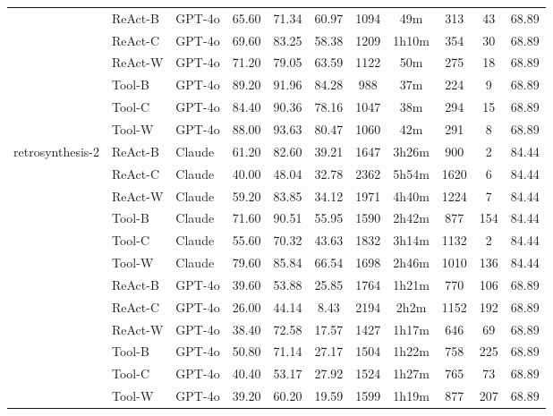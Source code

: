 \begin{longtable}{lllcccccccc}
 & ReAct-B & GPT-4o & 65.60 & 71.34 & 60.97 & 1094 & 49m & 313 & 43 & 68.89 \\
 & ReAct-C & GPT-4o & 69.60 & 83.25 & 58.38 & 1209 & 1h10m & 354 & 30 & 68.89 \\
 & ReAct-W & GPT-4o & 71.20 & 79.05 & 63.59 & 1122 & 50m & 275 & 18 & 68.89 \\
 & Tool-B & GPT-4o & 89.20 & 91.96 & 84.28 & 988 & 37m & 224 & 9 & 68.89 \\
 & Tool-C & GPT-4o & 84.40 & 90.36 & 78.16 & 1047 & 38m & 294 & 15 & 68.89 \\
 & Tool-W & GPT-4o & 88.00 & 93.63 & 80.47 & 1060 & 42m & 291 & 8 & 68.89 \\
retrosynthesis-2 & ReAct-B & Claude & 61.20 & 82.60 & 39.21 & 1647 & 3h26m & 900 & 2 & 84.44 \\
 & ReAct-C & Claude & 40.00 & 48.04 & 32.78 & 2362 & 5h54m & 1620 & 6 & 84.44 \\
 & ReAct-W & Claude & 59.20 & 83.85 & 34.12 & 1971 & 4h40m & 1224 & 7 & 84.44 \\
 & Tool-B & Claude & 71.60 & 90.51 & 55.95 & 1590 & 2h42m & 877 & 154 & 84.44 \\
 & Tool-C & Claude & 55.60 & 70.32 & 43.63 & 1832 & 3h14m & 1132 & 2 & 84.44 \\
 & Tool-W & Claude & 79.60 & 85.84 & 66.54 & 1698 & 2h46m & 1010 & 136 & 84.44 \\
 & ReAct-B & GPT-4o & 39.60 & 53.88 & 25.85 & 1764 & 1h21m & 770 & 106 & 68.89 \\
 & ReAct-C & GPT-4o & 26.00 & 44.14 & 8.43 & 2194 & 2h2m & 1152 & 192 & 68.89 \\
 & ReAct-W & GPT-4o & 38.40 & 72.58 & 17.57 & 1427 & 1h17m & 646 & 69 & 68.89 \\
 & Tool-B & GPT-4o & 50.80 & 71.14 & 27.17 & 1504 & 1h22m & 758 & 225 & 68.89 \\
 & Tool-C & GPT-4o & 40.40 & 53.17 & 27.92 & 1524 & 1h27m & 765 & 73 & 68.89 \\
 & Tool-W & GPT-4o & 39.20 & 60.20 & 19.59 & 1599 & 1h19m & 877 & 207 & 68.89 \\
\end{longtable}
